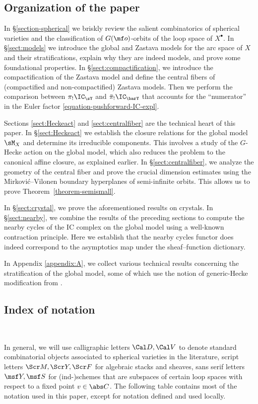 \subsection{Organization of the paper}
In \S\ref{section-spherical} we briskly review the salient combinatorics
of spherical varieties and the classification of $G(\mf o)$-orbits of the loop
space of $X^\bullet$. In \S\ref{sect:models} we introduce the
global and Zastava models for the arc space of $X$ and their stratifications, explain why they are indeed models,
and prove some foundational properties. In \S\ref{sect:compactification}, we
introduce the compactification of the Zastava model and define the
central fibers of (compactified and non-compactified) Zastava models. Then we
perform the comparison between $\pi_!\IC_{\sY}$ and $\bar\pi_! \IC_{\barY}$
that accounts for the ``numerator'' in the Euler factor \eqref{equation-pushforward-IC-expl}.

Sections \ref{sect:Heckeact} and \ref{sect:centralfiber} are the
technical heart of this paper. In \S\ref{sect:Heckeact} we establish
the closure relations for the global model $\sM_X$ and determine its irreducible
components. This involves a study of the $G$-Hecke action on the global model,
which also reduces the problem to the canonical affine closure, as explained
earlier. In \S\ref{sect:centralfiber}, we analyze the geometry of the
central fiber and prove the crucial dimension estimates using the
Mirkovi\'c--Vilonen boundary hyperplanes of semi-infinite orbits.
This allows us to prove Theorem~\ref{theorem-semismall}.

In \S\ref{sect:crystal}, we prove the aforementioned results on crystals.
In \S\ref{sect:nearby}, we combine the results of the preceding sections to
compute the nearby cycles of the IC complex on the global model using a
well-known contraction principle. Here we establish that
the nearby cycles functor does indeed correspond to the asymptotics map under
the sheaf--function dictionary.

In Appendix \ref{appendix:A}, we collect various technical results
concerning the stratification of the global model, some of which use the
notion of generic-Hecke modification from \cite{GN}.


\subsection{Index of notation}\

In general, we will use calligraphic
letters $\Cal D, \Cal V$ to denote standard combinatorial objects associated
to spherical varieties in the literature, script letters $\Scr M, \Scr Y, \Scr F$ for
algebraic stacks and sheaves, sans serif letters $\msf Y, \msf S$ for (ind-)schemes
that are subspaces of certain loop spaces with respect to a fixed point $v\in \abs C$. The following table contains most of the notation used in this paper, except for notation defined and used locally.


